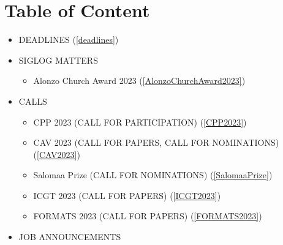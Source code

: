 \documentclass[prodmode,acmtecs]{acmsmall} %
\begin{document}
\section{Table of Content}\begin{itemize}\item DEADLINES (\cref{deadlines}) 
 
\item SIGLOG MATTERS 
 
\begin{itemize}\item Alonzo Church Award 2023 (\cref{AlonzoChurchAward2023})
\end{itemize} 
\item CALLS 
 
\begin{itemize}\item CPP 2023 (CALL FOR PARTICIPATION) (\cref{CPP2023})
\item CAV 2023 (CALL FOR PAPERS, CALL FOR NOMINATIONS) (\cref{CAV2023})
\item Salomaa Prize (CALL FOR NOMINATIONS) (\cref{SalomaaPrize})
\item ICGT 2023 (CALL FOR PAPERS) (\cref{ICGT2023})
\item FORMATS 2023 (CALL FOR PAPERS) (\cref{FORMATS2023})
\end{itemize} 
\item JOB ANNOUNCEMENTS 
 

\end{itemize}
\end{document}
